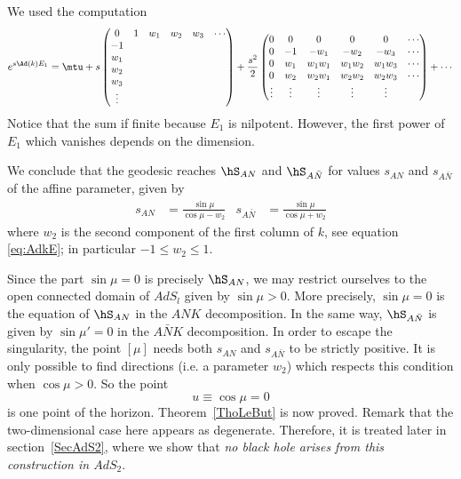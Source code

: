 We used the computation
\[
	e^{s\Ad(k)E_1}=\mtu+s
	\begin{pmatrix}
		0 & 1 & w_1 & w_2 & w_3 & \cdots \\
		-1                               \\w_1\\w_2\\w_3\\\vdots
	\end{pmatrix}
	+\frac{s^2}{2}
	\begin{pmatrix}
		0      & 0      & 0      & 0      & 0      & \cdots \\
		0      & -1     & -w_1   & -w_2   & -w_3   & \cdots \\
		0      & w_1    & w_1w_1 & w_1w_2 & w_1w_3 & \cdots \\
		0      & w_2    & w_2w_1 & w_2w_2 & w_2w_3 & \cdots \\
		\vdots & \vdots & \vdots & \vdots & \vdots
	\end{pmatrix}
	+\cdots
\]
Notice that the sum if finite because $E_1$ is nilpotent. However, the first power of $E_1$ which vanishes depends on the dimension.

We conclude that the geodesic reaches $\hS_{AN}$ and $\hS_{A\bar{N}}$ for values $s_{AN}$ and $s_{A\bar{N}}$ of the affine parameter, given by
\begin{align}   \label{eq:tempssingul}
	s_{AN} & = \frac{\sin\mu}{\cos\mu - w_2} & s_{A\bar{N}} & = \frac{\sin\mu}{\cos\mu + w_2}
\end{align}
where $w_{2}$ is the second component of the first column of $k$, see equation \eqref{eq:AdkE}; in particular $-1\leq w_2 \leq 1$.

Since the part $\sin \mu =0$ is precisely  $\hS_{AN}$, we may restrict ourselves to the open connected domain of $AdS_l$ given by $\sin \mu > 0$. More precisely, $\sin\mu=0$ is the equation of $\hS_{AN}$ in the $ANK$ decomposition. In the same way, $\hS_{A\bar{N}}$ is given by $\sin\mu'=0$ in the $A\bar{N}K$ decomposition.  In order to escape the singularity, the point $[\mu]$ needs both $s_{AN}$ and $s_{A\bar{N}}$ to be strictly positive.  It is only possible to find directions (i.e. a parameter $w_2$) which respects this condition when $\cos \mu>0$.  So the point
\begin{equation}  \label{EqUnPtHoriz}
	u\equiv \cos\mu=0
\end{equation}
is one point of the horizon. Theorem~\ref{ThoLeBut} is now proved. Remark that the two-dimensional case here appears as degenerate. Therefore, it is treated later in section~\ref{SecAdS2}, where we show that \emph{no black hole arises from this construction in $AdS_2$}.

